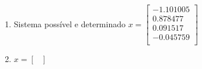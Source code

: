 \documentclass[a4paper]{article}
\begin{document}
\begin{enumerate}
\begin{enumerate}
  \item Sistema possível e determinado
    $x =
    \begin{bmatrix}
      -1.101005\\
      0.878477\\
      0.091517\\
      -0.045759\\
    \end{bmatrix}$

  \item 
    $x =
    \begin{bmatrix}
      \\
    \end{bmatrix}$

  \end{enumerate}

\end{enumerate}
\end{document}
